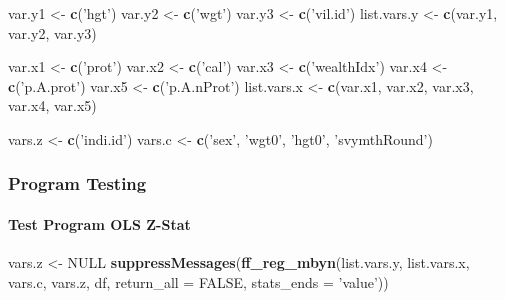 \documentclass[
]{book}
\newenvironment{Shaded}{\begin{snugshade}}{\end{snugshade}}
\newcommand{\DataTypeTok}[1]{\textcolor[rgb]{0.13,0.29,0.53}{#1}}
\newcommand{\KeywordTok}[1]{\textcolor[rgb]{0.13,0.29,0.53}{\textbf{#1}}}
\newcommand{\NormalTok}[1]{#1}
\newcommand{\OtherTok}[1]{\textcolor[rgb]{0.56,0.35,0.01}{#1}}
\newcommand{\StringTok}[1]{\textcolor[rgb]{0.31,0.60,0.02}{#1}}
\begin{document}
\begin{Shaded}
\begin{Highlighting}[]
\NormalTok{var.y1 <-}\StringTok{ }\KeywordTok{c}\NormalTok{(}\StringTok{'hgt'}\NormalTok{)}
\NormalTok{var.y2 <-}\StringTok{ }\KeywordTok{c}\NormalTok{(}\StringTok{'wgt'}\NormalTok{)}
\NormalTok{var.y3 <-}\StringTok{ }\KeywordTok{c}\NormalTok{(}\StringTok{'vil.id'}\NormalTok{)}
\NormalTok{list.vars.y <-}\StringTok{ }\KeywordTok{c}\NormalTok{(var.y1, var.y2, var.y3)}

\NormalTok{var.x1 <-}\StringTok{ }\KeywordTok{c}\NormalTok{(}\StringTok{'prot'}\NormalTok{)}
\NormalTok{var.x2 <-}\StringTok{ }\KeywordTok{c}\NormalTok{(}\StringTok{'cal'}\NormalTok{)}
\NormalTok{var.x3 <-}\StringTok{ }\KeywordTok{c}\NormalTok{(}\StringTok{'wealthIdx'}\NormalTok{)}
\NormalTok{var.x4 <-}\StringTok{ }\KeywordTok{c}\NormalTok{(}\StringTok{'p.A.prot'}\NormalTok{)}
\NormalTok{var.x5 <-}\StringTok{ }\KeywordTok{c}\NormalTok{(}\StringTok{'p.A.nProt'}\NormalTok{)}
\NormalTok{list.vars.x <-}\StringTok{ }\KeywordTok{c}\NormalTok{(var.x1, var.x2, var.x3, var.x4, var.x5)}

\NormalTok{vars.z <-}\StringTok{ }\KeywordTok{c}\NormalTok{(}\StringTok{'indi.id'}\NormalTok{)}
\NormalTok{vars.c <-}\StringTok{ }\KeywordTok{c}\NormalTok{(}\StringTok{'sex'}\NormalTok{, }\StringTok{'wgt0'}\NormalTok{, }\StringTok{'hgt0'}\NormalTok{, }\StringTok{'svymthRound'}\NormalTok{)}
\end{Highlighting}
\end{Shaded}

\hypertarget{program-testing-2}{%
\subsubsection{Program Testing}\label{program-testing-2}}

\hypertarget{test-program-ols-z-stat}{%
\paragraph{Test Program OLS Z-Stat}\label{test-program-ols-z-stat}}

\begin{Shaded}
\begin{Highlighting}[]
\NormalTok{vars.z <-}\StringTok{ }\OtherTok{NULL}
\KeywordTok{suppressMessages}\NormalTok{(}\KeywordTok{ff_reg_mbyn}\NormalTok{(list.vars.y, list.vars.x,}
\NormalTok{                             vars.c, vars.z, df,}
                             \DataTypeTok{return_all =} \OtherTok{FALSE}\NormalTok{,}
                             \DataTypeTok{stats_ends =} \StringTok{'value'}\NormalTok{))}
\end{Highlighting}
\end{Shaded}
\end{document}
